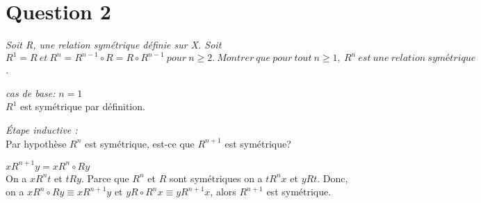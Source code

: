 \section*{Question 2}
\emph{Soit R, une relation symétrique définie sur X. Soit $R^1 = R\ et\ R^n = R^{n-1} \circ R = R \circ R^{n-1}\ pour\ n \geq 2.\ Montrer\ que\ pour\ tout\ n\geq1,\ R^n\ est\ une\ relation\ symétrique$.}

\bigskip

\emph{cas de base: }
$n = 1$\\
$R^1$ est symétrique par définition.

\bigskip

\emph{Étape inductive : }\\
Par hypothèse $R^n$ est symétrique, est-ce que $R^{n+1}$ est symétrique?
\bigskip

$xR^{n+1}y = xR^n \circ Ry$\\
On a $xR^nt$ et $tRy$. Parce que $R^n$ et $R$ sont symétriques on a $tR^nx$ et $yRt$. Donc, on a $xR^n \circ Ry \equiv xR^{n+1}y$ et $yR \circ R^nx \equiv yR^{n+1}x$, alors $R^{n+1}$ est symétrique.